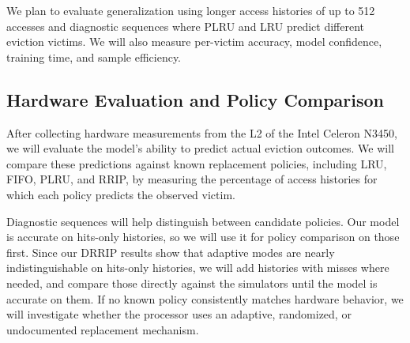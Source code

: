 We plan to evaluate generalization using longer access
histories of up to 512 accesses and diagnostic sequences
where PLRU and LRU predict different eviction victims.
We will also measure per-victim accuracy, model confidence,
training time, and sample efficiency.

\subsection{Hardware Evaluation and Policy Comparison}

After collecting hardware measurements from the L2 of the
Intel Celeron N3450, we will evaluate
the model's ability to predict actual eviction outcomes.
We will compare these predictions against known replacement
policies, including LRU, FIFO, PLRU, and RRIP, by measuring
the percentage of access histories for which each policy
predicts the observed victim.

Diagnostic sequences will help distinguish between
candidate policies. Our model is accurate on hits-only
histories, so we will use it for policy comparison on
those first. Since our DRRIP results show that adaptive
modes are nearly indistinguishable on hits-only histories,
we will add histories with misses where needed, and compare
those directly against the simulators until the model is
accurate on them. If
no known policy consistently
matches hardware behavior, we will investigate whether
the processor uses an adaptive, randomized, or
undocumented replacement mechanism.

